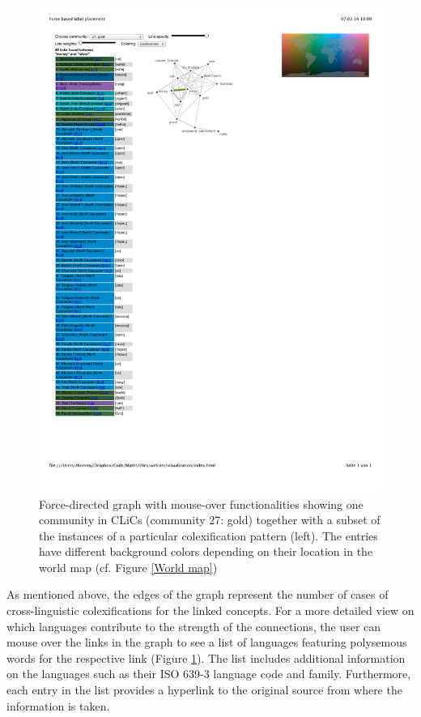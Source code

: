 \begin{figure}[htbp]
\begin{center}
\includegraphics[width=\textwidth]{img/moneysilverexample.pdf}
\caption{Force-directed graph with mouse-over functionalities showing one community in CLiCs (community 27: gold) together with a subset of the instances of a particular colexification pattern (left). The entries have different background colors depending on their location in the world map (cf. Figure \ref{World map})}
\label{MoneySilver}
\end{center}
\end{figure}




As mentioned above, the edges of the graph represent the number of cases of cross-linguistic colexifications for the linked concepts. For a more detailed view on which languages contribute to the strength of the connections, the user can mouse over the links in the graph to see a list of  languages featuring polysemous words for the respective link (Figure \ref{MoneySilver}). The list includes additional information on the languages such as their ISO 639-3 language code and family. Furthermore, each entry in the list provides a hyperlink to the original source from where the information is taken.  


